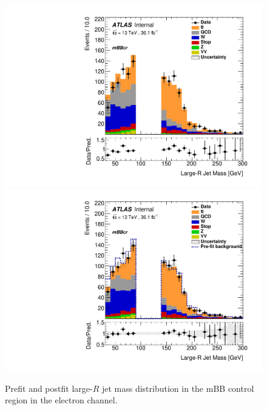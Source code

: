 \begin{figure}[!htbp]
\begin{center}
\includegraphics[scale=0.33]{./figures/boosted/CR_QCDFloat_El/QCDFloat_mBBcr_El_Prefit} 
\includegraphics[scale=0.33]{./figures/boosted/CR_QCDFloat_El/QCDFloat_mBBcr_El_Postfit}\\
\caption{Prefit and postfit large-$R$ jet mass distribution in the mBB control region in the electron channel.}
\label{fig:boostedabcd_mbbcr_elec_fit}
\end{center}
\end{figure}

